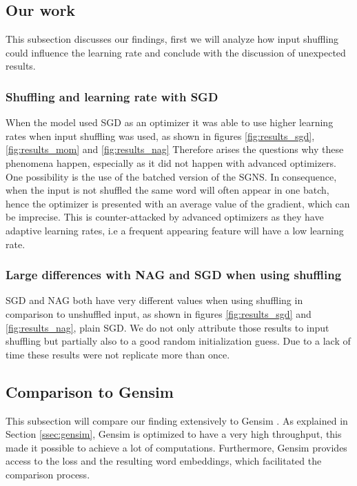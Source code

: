 \documentclass[conference]{IEEEtran}
\begin{document}
\subsection{Our work}
This subsection discusses our findings, first we will analyze how input shuffling could influence the learning rate and conclude with the discussion of unexpected results.

\subsubsection{Shuffling and learning rate with SGD}
When the model used SGD as an optimizer it was able to use higher learning rates when input shuffling was used, as shown in figures \ref{fig:results_sgd}, \ref{fig:results_mom} and \ref{fig:results_nag} Therefore arises the questions why these phenomena happen, especially as it did not happen with advanced optimizers. One possibility is the use of the batched version of the SGNS. In consequence, when the input is not shuffled the same word will often appear in one batch, hence the optimizer is presented with an average value of the gradient, which can be imprecise. This is counter-attacked by advanced optimizers as they have adaptive learning rates, i.e a frequent appearing feature will have a low learning rate.

\subsubsection{Large differences with NAG and SGD when using shuffling}
SGD and NAG both have very different values when using shuffling in comparison to unshuffled input, as shown in figures \ref{fig:results_sgd} and \ref{fig:results_nag}, plain SGD. We do not only attribute those results to input shuffling but partially also to a good random initialization guess. Due to a lack of time these results were not replicate more than once.

\subsection{Comparison to Gensim}
This subsection will compare our finding extensively to Gensim \cite{gensim}. As explained in Section \ref{ssec:gensim}, Gensim is optimized to have a very high throughput, this made it possible to achieve a lot of computations. Furthermore, Gensim provides access to the loss and the resulting word embeddings, which facilitated the comparison process.
\end{document}
